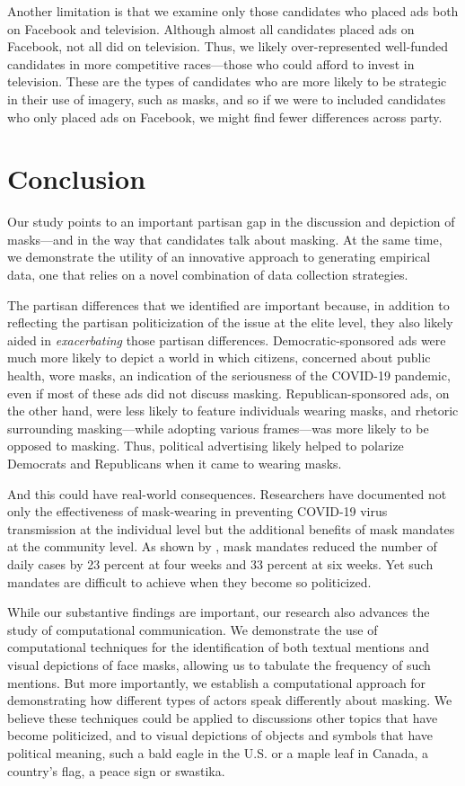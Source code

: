 {Another limitation is that we examine only those candidates who placed ads both on Facebook and television.  Although almost all candidates placed ads on Facebook, not all did on television.  Thus, we likely over-represented well-funded candidates in more competitive races---those who could afford to invest in television.  These are the types of candidates who are more likely to be strategic in their use of imagery, such as masks, and so if we were to included candidates who only placed ads on Facebook, we might find fewer differences across party.

\section*{Conclusion}

Our study points to an important partisan gap in the discussion and depiction of masks---and in the way that candidates talk about masking. At the same time, we demonstrate the utility of an innovative approach to generating empirical data, one that relies on a novel combination of data collection strategies.  

The partisan differences that we identified are important because, in addition to reflecting the partisan politicization of the issue at the elite level, they also likely aided in \emph{exacerbating} those partisan differences. Democratic-sponsored ads were much more likely to depict a world in which citizens, concerned about public health, wore masks, an indication of the seriousness of the COVID-19 pandemic, even if most of these ads did not discuss masking. Republican-sponsored ads, on the other hand, were less likely to feature individuals wearing masks, and rhetoric surrounding masking---while adopting various frames---was more likely to be opposed to masking.  Thus, political advertising likely helped to polarize Democrats and Republicans when it came to wearing masks.  

And this could have real-world consequences. Researchers have documented not only the effectiveness of mask-wearing in preventing COVID-19 virus transmission at the individual level but the additional benefits of mask mandates at the community level. As shown by \cite{huang_effectiveness_2022}, mask mandates reduced the number of daily cases by 23 percent at four weeks and 33 percent at six weeks. Yet such mandates are difficult to achieve when they become so politicized.  

While our substantive findings are important, our research also advances the study of computational communication. We demonstrate the use of computational techniques for the identification of both textual mentions and visual depictions of face masks, allowing us to tabulate the frequency of such mentions.  But more importantly, we establish a computational approach for demonstrating how different types of actors speak differently about masking.  We believe these techniques could be applied to discussions other topics that have become politicized, and to visual depictions of objects and symbols that have political meaning, such a bald eagle in the U.S. or a maple leaf in Canada, a country's flag, a peace sign or swastika.

}
